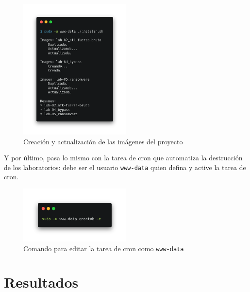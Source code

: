         \begin{figure}[!htbp]
            \centering

            \includegraphics[width=0.5\textwidth]{images/Capturas/comandos/instalacion.png}
            \caption{Creación y actualización de las imágenes del proyecto}
            \label{fig:instalacion}
        \end{figure}

        Y por último, pasa lo mismo con la tarea de cron que automatiza la destrucción de los laboratorios: debe ser el usuario \texttt{www-data} quien defina y active la tarea de cron.

        \begin{figure}[!htbp]
            \centering

            \includegraphics[width=0.5\textwidth]{images/Capturas/comandos/crontab.png}
            \caption{Comando para editar la tarea de cron como \texttt{www-data}}
            \label{fig:crontab}
        \end{figure}

        \cleardoublepage


    
\chapter{Resultados}

